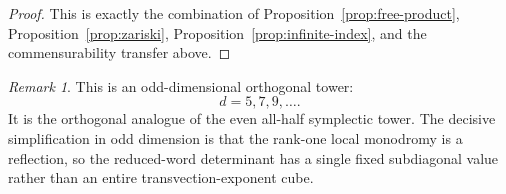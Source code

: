 \documentclass[a4paper,11pt]{amsart}
\theoremstyle{remark}
\newtheorem{remark}[theorem]{Remark}
\numberwithin{equation}{section}
\begin{document}
\begin{proof}
This is exactly the combination of Proposition~\ref{prop:free-product}, Proposition~\ref{prop:zariski}, Proposition~\ref{prop:infinite-index}, and the commensurability transfer above.
\end{proof}

\begin{remark}
This is an odd-dimensional orthogonal tower:
\[
        d=5,7,9,\ldots.
\]
It is the orthogonal analogue of the even all-half symplectic tower.  The decisive simplification in odd dimension is that the rank-one local monodromy is a reflection, so the reduced-word determinant has a single fixed subdiagonal value rather than an entire transvection-exponent cube.
\end{remark}
\end{document}
